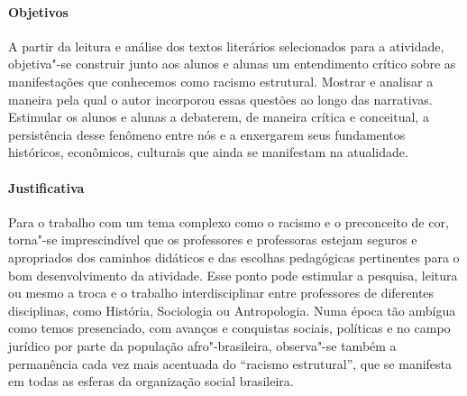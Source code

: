 \documentclass{extarticle}
\begin{document}
\paragraph{Objetivos} A partir da leitura e análise dos textos literários
selecionados para a atividade, objetiva"-se construir junto aos alunos e
alunas um entendimento crítico sobre as manifestações que conhecemos
como racismo estrutural. Mostrar e analisar a maneira pela qual o autor
incorporou essas questões ao longo das narrativas. Estimular os alunos e
alunas a debaterem, de maneira crítica e conceitual, a persistência
desse fenômeno entre nós e a enxergarem seus fundamentos históricos,
econômicos, culturais que ainda se manifestam na atualidade.


\paragraph{Justificativa} Para o trabalho com um tema complexo como o
racismo e o preconceito de cor, torna"-se imprescindível que os
professores e professoras estejam seguros e apropriados dos caminhos
didáticos e das escolhas pedagógicas pertinentes para o bom
desenvolvimento da atividade. Esse ponto pode estimular a pesquisa,
leitura ou mesmo a troca e o trabalho interdisciplinar entre professores
de diferentes disciplinas, como História, Sociologia ou Antropologia.
Numa época tão ambígua como temos presenciado, com avanços e conquistas
sociais, políticas e no campo jurídico por parte da população
afro"-brasileira, observa"-se também a permanência cada vez mais acentuada
do ``racismo estrutural'', que se manifesta em todas as esferas da
organização social brasileira.
\end{document}
